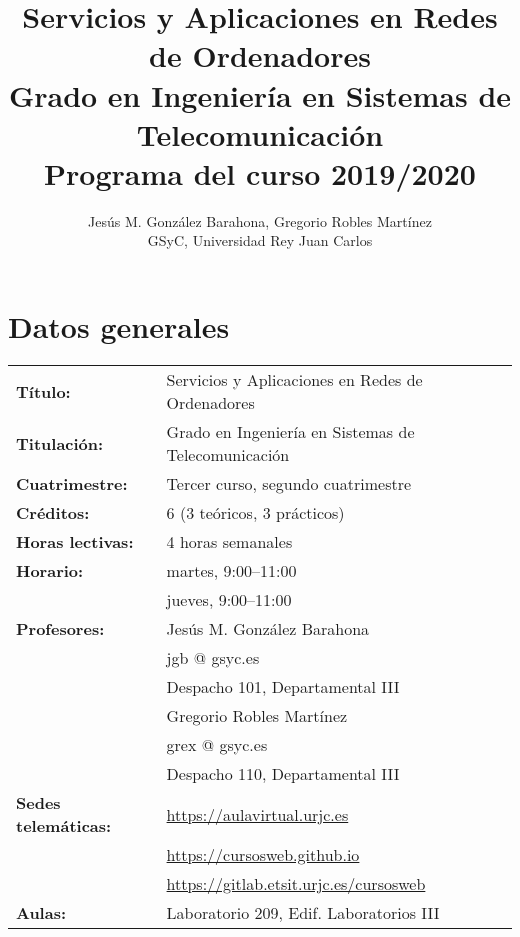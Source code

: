\documentclass[a4paper,12pt]{article}
\title{Servicios y Aplicaciones en Redes de Ordenadores \\
Grado en Ingeniería en Sistemas de Telecomunicación \\
Programa del curso 2019/2020}
\author{Jesús M. González Barahona, Gregorio Robles Martínez \\
GSyC, Universidad Rey Juan Carlos}
\begin{document}
\maketitle

\tableofcontents

\newpage

\section{Datos generales}

\begin{tabular}{ll}
\textbf{Título:} & Servicios y Aplicaciones en Redes de Ordenadores  \\
\textbf{Titulación:} & Grado en Ingeniería en Sistemas de Telecomunicación \\
\textbf{Cuatrimestre:} & Tercer curso, segundo cuatrimestre \\
\textbf{Créditos:} & 6 (3 teóricos, 3 prácticos) \\
\textbf{Horas lectivas:} & 4 horas semanales \\
\textbf{Horario:} & martes, 9:00--11:00 \\
                  & jueves, 9:00--11:00 \\
\textbf{Profesores:}
& Jesús M. González Barahona \\
& \hspace{1cm}jgb @ gsyc.es \\
& \hspace{1cm}Despacho 101, Departamental III\\
& Gregorio Robles Martínez\\
& \hspace{1cm}grex @ gsyc.es \\
& \hspace{1cm}Despacho 110, Departamental III\\
\textbf{Sedes telemáticas:} & \url{https://aulavirtual.urjc.es} \\
                            & \url{https://cursosweb.github.io} \\
                            & \url{https://gitlab.etsit.urjc.es/cursosweb} \\
\textbf{Aulas:} & Laboratorio 209, Edif. Laboratorios III
\end{tabular}
\end{document}
